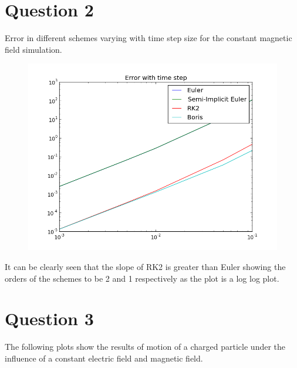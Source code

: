 \documentclass[11pt, a4paper]{article}
\begin{document}
\section{Question 2}
Error in different schemes varying with time step size for the constant magnetic field simulation.
\begin{figure}[H]
 \centering
 \includegraphics[width = \textwidth]{q2_Error.png}
\end{figure}

It can be clearly seen that the slope of RK2 is greater than Euler showing the orders of the schemes to be 2 and 1 respectively as the plot is a log log plot.

\section{Question 3}
The following plots show the results of motion of a charged particle under the influence of a constant electric field and magnetic field.
\end{document}
